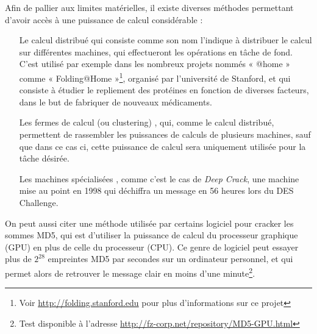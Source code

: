 Afin de pallier aux limites matérielles, il existe diverses
méthodes permettant d'avoir accès à une puissance de
calcul considérable :
\begin{itemize}
  \renewcommand{\makelabel}[1]{\sffamily\textbf{#1}}
  \item[Le calcul distribué] qui consiste comme son nom l'indique
à distribuer le calcul sur différentes machines, qui effectueront
les opérations en tâche de fond. C'est utilisé par exemple dans
les nombreux projets nommés « @home » comme « Folding@Home
»\footnote{Voir \url{http://folding.stanford.edu} pour plus
d'informations sur ce projet},
organisé par l'université de Stanford, et qui consiste à étudier
le repliement des protéines en fonction de diverses facteurs, dans
le but de fabriquer de nouveaux médicaments.
  \item[Les fermes de calcul (ou clustering)], qui, comme le
calcul distribué, permettent de rassembler les puissances de
calculs de plusieurs machines, sauf que dans ce cas ci, cette
puissance de calcul sera uniquement utilisée pour la tâche
désirée.
  \item[Les machines spécialisées], comme c'est le cas de
\emph{Deep Crack}, une machine mise au point en 1998 qui déchiffra
un message en 56 heures lors du DES Challenge.\\
\end{itemize}

On peut aussi citer une méthode utilisée par certains logiciel pour
cracker les sommes MD5, qui est d'utiliser la
puissance de calcul du processeur graphique (GPU) en plus de celle
du processeur (CPU). Ce genre de logiciel peut essayer plus de
$2^{28}$ empreintes MD5 par secondes sur un ordinateur 
personnel, et qui permet alors de retrouver le message clair en
moins d'une minute\footnote{Test disponible à l'adresse
\url{http://fz-corp.net/repository/MD5-GPU.html}}.

